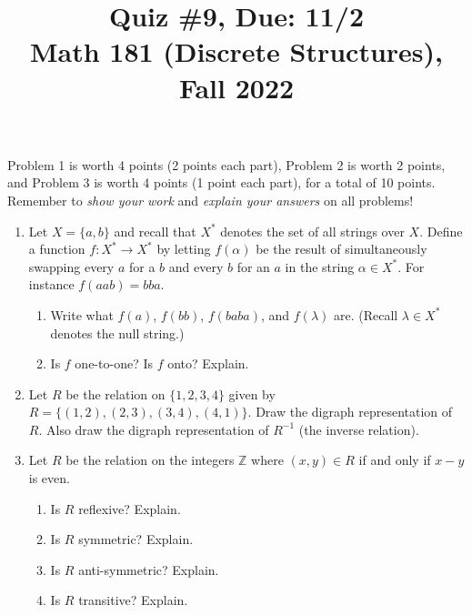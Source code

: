 \documentclass[11pt]{article}
\title{Quiz \#9, Due: 11/2 \\Math 181 (Discrete Structures), Fall 2022}
\date{}
\begin{document}
\maketitle

\thispagestyle{empty}

\vspace{-1cm}

Problem 1 is worth 4 points (2 points each part), Problem 2 is worth 2 points, and Problem 3 is worth 4 points (1 point each part), for a total of 10 points. Remember to \emph{show your work} and \emph{explain your answers} on all problems!

\begin{enumerate}

\item Let $X=\{a,b\}$ and recall that $X^*$ denotes the set of all strings over $X$. Define a function $f\colon X^* \to X^*$ by letting $f(\alpha)$ be the result of simultaneously swapping every $a$ for a $b$ and every $b$ for an $a$ in the string $\alpha \in X^*$. For instance $f(aab) = bba$.
\begin{enumerate}
\item Write what $f(a)$, $f(bb)$, $f(baba)$, and $f(\lambda)$ are. (Recall $\lambda \in X^*$ denotes the null string.)
\item Is $f$ one-to-one? Is $f$ onto? Explain.
\end{enumerate}

\item Let $R$ be the relation on $\{1,2,3,4\}$ given by $R = \{(1,2),(2,3),(3,4),(4,1)\}$. Draw the digraph representation of $R$. Also draw the digraph representation of $R^{-1}$ (the inverse relation).

\item Let $R$ be the relation on the integers $\mathbb{Z}$ where $(x,y) \in R$ if and only if $x-y$ is even.
\begin{enumerate}
\item Is $R$ reflexive? Explain.
\item Is $R$ symmetric? Explain.
\item Is $R$ anti-symmetric? Explain.
\item Is $R$ transitive? Explain.
\end{enumerate}

\end{enumerate}
\end{document}
